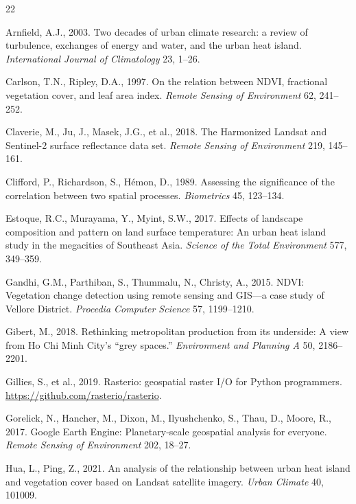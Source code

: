 \documentclass[preprint,12pt]{elsarticle}
\begin{document}
\begin{thebibliography}{22}

Arnfield, A.J., 2003. Two decades of urban climate research: a review of turbulence, exchanges of energy and water, and the urban heat island. \textit{International Journal of Climatology} 23, 1--26.

Carlson, T.N., Ripley, D.A., 1997. On the relation between NDVI, fractional vegetation cover, and leaf area index. \textit{Remote Sensing of Environment} 62, 241--252.

Claverie, M., Ju, J., Masek, J.G., et al., 2018. The Harmonized Landsat and Sentinel-2 surface reflectance data set. \textit{Remote Sensing of Environment} 219, 145--161.

Clifford, P., Richardson, S., Hémon, D., 1989. Assessing the significance of the correlation between two spatial processes. \textit{Biometrics} 45, 123--134.

Estoque, R.C., Murayama, Y., Myint, S.W., 2017. Effects of landscape composition and pattern on land surface temperature: An urban heat island study in the megacities of Southeast Asia. \textit{Science of the Total Environment} 577, 349--359.

Gandhi, G.M., Parthiban, S., Thummalu, N., Christy, A., 2015. NDVI: Vegetation change detection using remote sensing and GIS---a case study of Vellore District. \textit{Procedia Computer Science} 57, 1199--1210.

Gibert, M., 2018. Rethinking metropolitan production from its underside: A view from Ho Chi Minh City's ``grey spaces.'' \textit{Environment and Planning A} 50, 2186--2201.

Gillies, S., et al., 2019. Rasterio: geospatial raster I/O for Python programmers. \url{https://github.com/rasterio/rasterio}.

Gorelick, N., Hancher, M., Dixon, M., Ilyushchenko, S., Thau, D., Moore, R., 2017. Google Earth Engine: Planetary-scale geospatial analysis for everyone. \textit{Remote Sensing of Environment} 202, 18--27.

Hua, L., Ping, Z., 2021. An analysis of the relationship between urban heat island and vegetation cover based on Landsat satellite imagery. \textit{Urban Climate} 40, 101009.


\end{thebibliography}
\end{document}
